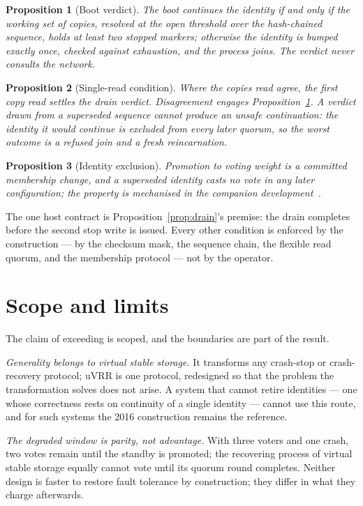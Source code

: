 \documentclass[10pt,journal,letterpaper]{IEEEtran}
\newtheorem{proposition}{Proposition}
\begin{document}
\begin{proposition}[Boot verdict]\label{prop:verdict}
The boot continues the identity if and only if the working set of copies,
resolved at the open threshold over the hash-chained sequence, holds at least
two \emph{stopped} markers; otherwise the identity is bumped exactly once,
checked against exhaustion, and the process joins.
The verdict never consults the network.
\end{proposition}

\begin{proposition}[Single-read condition]\label{prop:single}
Where the copies read agree, the first copy read settles the drain verdict.
Disagreement engages Proposition~\ref{prop:verdict}.
A verdict drawn from a superseded sequence cannot produce an unsafe
continuation: the identity it would continue is excluded from every later
quorum, so the worst outcome is a refused join and a fresh reincarnation.
\end{proposition}

\begin{proposition}[Identity exclusion]\label{prop:exclusion}
Promotion to voting weight is a committed membership change, and a superseded
identity casts no vote in any later configuration; the property is
mechanised in the companion development~\cite{uvrr,artifact}.
\end{proposition}

The one host contract is Proposition~\ref{prop:drain}'s premise: the drain
completes before the second stop write is issued.
Every other condition is enforced by the construction --- by the checksum
mask, the sequence chain, the flexible read quorum, and the membership
protocol --- not by the operator.

\section{Scope and limits}\label{sec:scope}
The claim of exceeding is scoped, and the boundaries are part of the result.

\emph{Generality belongs to virtual stable storage.}
It transforms any crash-stop or crash-recovery protocol; uVRR is one
protocol, redesigned so that the problem the transformation solves does not
arise.
A system that cannot retire identities --- one whose correctness rests on
continuity of a single identity --- cannot use this route, and for such
systems the 2016 construction remains the reference.

\emph{The degraded window is parity, not advantage.}
With three voters and one crash, two votes remain until the standby is
promoted; the recovering process of virtual stable storage equally cannot
vote until its quorum round completes.
Neither design is faster to restore fault tolerance by construction; they
differ in what they charge afterwards.
\end{document}
